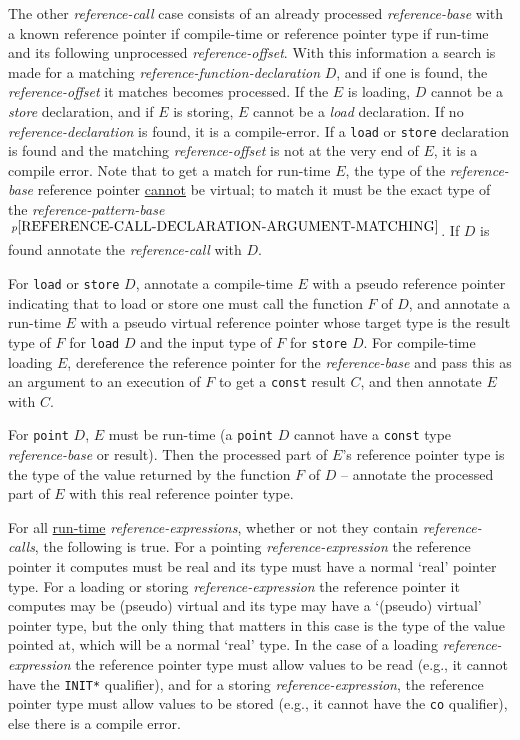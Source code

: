 \documentclass[12pt]{article}
\newcommand{\pagnote}[1]{$\,^{p\pageref{#1}}$}
\begin{document}
\begin{enumerate}
The other {\em reference-call} case consists of an already processed
{\em reference-base} with a known reference pointer if compile-time
or reference pointer type if run-time
and its following unprocessed {\em reference-offset}.  With this
information a search is made for a matching
{\em reference-function-declaration} $D$, and if one is found,
the {\em reference-offset} it matches becomes processed.
If the $E$ is loading, $D$ cannot be a {\em store} declaration,
and if $E$ is storing, $E$ cannot be a {\em load} declaration.  If no
{\em reference-declaration} is found, it is a compile-error.
If a {\tt load} or {\tt store} declaration is found and the matching
{\em reference-offset} is not at the very end of $E$, it is a
compile error.
Note that to get a match for run-time $E$, the type of the
{\em reference-base} reference pointer \underline{cannot} be virtual;
to match it must be the exact type of the {\em reference-pattern-base}
\pagnote{REFERENCE-CALL-DECLARATION-ARGUMENT-MATCHING}.
If $D$ is found annotate the {\em reference-call} with $D$.

For {\tt load} or {\tt store} $D$,
annotate a compile-time $E$ with 
a pseudo reference pointer indicating that to load or store one
must call the function $F$ of $D$, and annotate a run-time $E$ with
a pseudo virtual reference pointer whose target type is the
result type of $F$ for {\tt load} $D$ and the input type of $F$
for {\tt store} $D$.
For compile-time loading $E$, dereference the reference pointer
for the {\em reference-base} and pass this as an argument to an
execution of $F$ to get a {\tt const} result $C$, and then
annotate $E$ with $C$.

For {\tt point} $D$, $E$ must be run-time
(a {\tt point} $D$ cannot have a {\tt const} type {\em reference-base}
or result).  Then the processed part of $E$'s reference pointer
type is the type of the value returned by the function $F$ of $D$ --
annotate the processed part of $E$ with this real reference pointer type.

For all \underline{run-time}
{\em reference-expressions}, whether or not they contain
{\em reference-calls}, the following is true.
For a pointing {\em reference-expression} the reference pointer it
computes must be real and its type must have a normal `real' pointer type.
For a loading or storing {\em reference-expression} the reference
pointer it computes may be (pseudo) virtual and its type may have a
`(pseudo) virtual'
pointer type, but the only thing that matters in this case is the
type of the value pointed at, which will be a normal `real' type.
In the case of a loading {\em reference-expression} the reference
pointer type must allow values to be read (e.g., it cannot have
the {\tt *INIT*} qualifier), and for a storing 
{\em reference-expression},
the reference pointer type must allow values to be stored
(e.g., it cannot have the {\tt co} qualifier), else there is a compile
error.

\end{enumerate}
\end{document}
